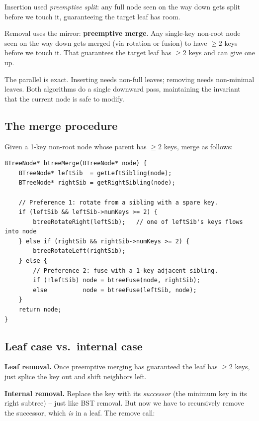 \documentclass[11pt]{article}
\begin{document}
Insertion used \emph{preemptive split}: any full node seen on the way down gets split before we touch it, guaranteeing the target leaf has room.

Removal uses the mirror: \textbf{preemptive merge}. Any single-key non-root node seen on the way down gets merged (via rotation or fusion) to have $\geq 2$ keys before we touch it. That guarantees the target leaf has $\geq 2$ keys and can give one up.

\begin{ideabox}
The parallel is exact. Inserting needs non-full leaves; removing needs non-minimal leaves. Both algorithms do a single downward pass, maintaining the invariant that the current node is safe to modify.
\end{ideabox}

\subsection*{The merge procedure}

Given a 1-key non-root node whose parent has $\geq 2$ keys, merge as follows:

\begin{lstlisting}[basicstyle=\ttfamily\small,frame=single]
BTreeNode* btreeMerge(BTreeNode* node) {
    BTreeNode* leftSib  = getLeftSibling(node);
    BTreeNode* rightSib = getRightSibling(node);

    // Preference 1: rotate from a sibling with a spare key.
    if (leftSib && leftSib->numKeys >= 2) {
        btreeRotateRight(leftSib);   // one of leftSib's keys flows into node
    } else if (rightSib && rightSib->numKeys >= 2) {
        btreeRotateLeft(rightSib);
    } else {
        // Preference 2: fuse with a 1-key adjacent sibling.
        if (!leftSib) node = btreeFuse(node, rightSib);
        else          node = btreeFuse(leftSib, node);
    }
    return node;
}
\end{lstlisting}

\subsection*{Leaf case vs.\ internal case}

\textbf{Leaf removal.} Once preemptive merging has guaranteed the leaf has $\geq 2$ keys, just splice the key out and shift neighbors left.

\textbf{Internal removal.} Replace the key with its \emph{successor} (the minimum key in its right subtree) -- just like BST removal. But now we have to recursively remove the successor, which \emph{is} in a leaf. The remove call:
\end{document}
